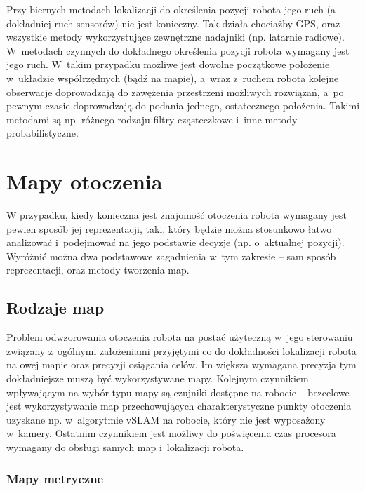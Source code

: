 Przy biernych metodach lokalizacji do określenia pozycji robota jego ruch
(a dokładniej ruch sensorów) nie jest konieczny. Tak działa chociażby GPS, oraz
wszystkie metody wykorzystujące zewnętrzne nadajniki (np. latarnie radiowe). 
W~metodach czynnych do dokładnego określenia pozycji robota wymagany jest jego
ruch. W~takim przypadku możliwe jest dowolne początkowe położenie w~układzie
współrzędnych (bądź na mapie), a~wraz z~ruchem robota kolejne obserwacje
doprowadzają do zawężenia przestrzeni możliwych rozwiązań, a~po pewnym czasie
doprowadzają do podania jednego, ostatecznego położenia. Takimi metodami są np.
różnego rodzaju filtry cząsteczkowe i~inne metody probabilistyczne.

\section{Mapy otoczenia}

W przypadku, kiedy konieczna jest znajomość otoczenia robota wymagany jest pewien
sposób jej reprezentacji, taki, który będzie można stosunkowo łatwo analizować
i~podejmować na jego podstawie decyzje (np. o~aktualnej pozycji). Wyróżnić
można dwa podstawowe zagadnienia w~tym zakresie -- sam sposób reprezentacji,
oraz metody tworzenia map.

\subsection{Rodzaje map}

Problem odwzorowania otoczenia robota na postać użyteczną w~jego sterowaniu
związany z~ogólnymi założeniami przyjętymi co do dokładności lokalizacji robota
na owej mapie oraz precyzji osiągania celów. Im większa wymagana precyzja
tym dokładniejsze muszą być wykorzystywane mapy. Kolejnym czynnikiem wpływającym
na wybór typu mapy są czujniki dostępne na robocie -- bezcelowe jest wykorzystywanie
map przechowujących charakterystyczne punkty otoczenia uzyskane np. w~algorytmie
vSLAM na robocie, który nie jest wyposażony w~kamery. Ostatnim czynnikiem
jest możliwy do poświęcenia czas procesora wymagany do obsługi samych map
i~lokalizacji robota.

\subsubsection{Mapy metryczne}

